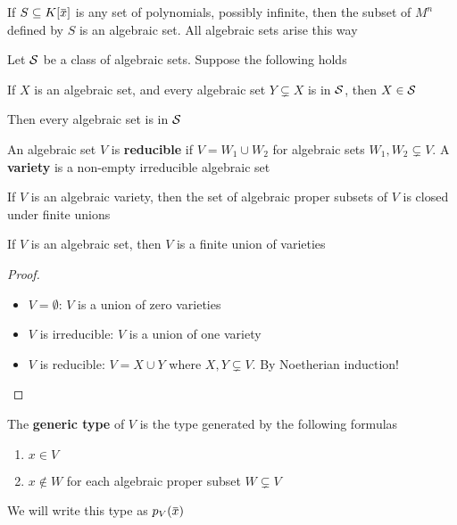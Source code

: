 \documentclass[11pt]{article}
\begin{document}
\begin{corollary}[]
If \(S\subseteq K[\barx]\) is any set of polynomials, possibly infinite, then the subset of \(M^n\)
defined by \(S\) is an algebraic set. All algebraic sets arise this way
\end{corollary}

\begin{corollary}
Let \(\mathcal{S}\) be a class of algebraic sets. Suppose the following holds
\begin{center}
If \(X\) is an algebraic set, and every algebraic set \(Y\subsetneq X\) is in \(\mathcal{S}\), then \(X\in\mathcal{S}\)
\end{center}
Then every algebraic set is in \(\mathcal{S}\)
\end{corollary}

\begin{definition}[]
An algebraic set \(V\) is \textbf{reducible} if \(V=W_1\cup W_2\) for algebraic sets \(W_1,W_2\subsetneq V\). A
\textbf{variety} is a non-empty irreducible algebraic set
\end{definition}

\begin{remark}
\label{24.26}
If \(V\) is an algebraic variety, then the set of algebraic proper subsets of \(V\) is closed
under finite unions
\end{remark}

\begin{proposition}[]
If \(V\) is an algebraic set, then \(V\) is a finite union of varieties
\end{proposition}

\begin{proof}
\begin{itemize}
\item \(V=\emptyset\): \(V\) is a union of zero varieties
\item \(V\) is irreducible: \(V\) is a union of one variety
\item \(V\) is reducible: \(V=X\cup Y\) where \(X,Y\subsetneq V\). By Noetherian induction!
\end{itemize}
\end{proof}

\begin{definition}[]
The \textbf{generic type} of \(V\) is the type generated by the following formulas
\begin{enumerate}
\item \(x\in V\)
\item \(x\notin W\) for each algebraic proper subset \(W\subsetneq V\)
\end{enumerate}


We will write this type as \(p_V(\barx)\)
\end{definition}
\end{document}
